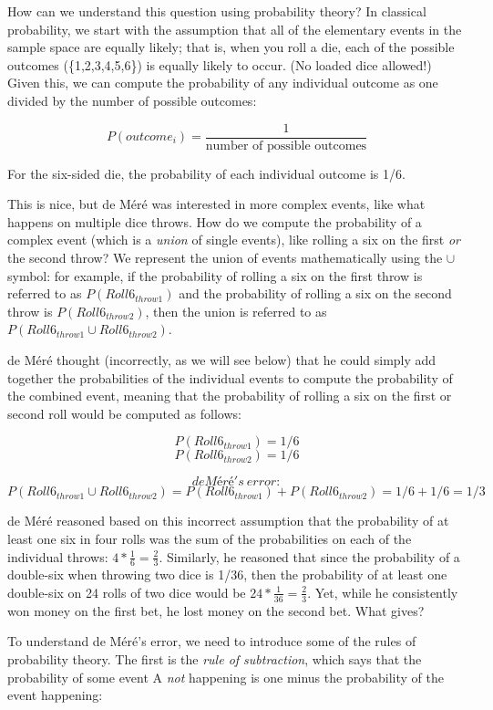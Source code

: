 \documentclass[
  12pt,
]{book}
\begin{document}
How can we understand this question using probability theory? In classical probability, we start with the assumption that all of the elementary events in the sample space are equally likely; that is, when you roll a die, each of the possible outcomes (\{1,2,3,4,5,6\}) is equally likely to occur. (No loaded dice allowed!) Given this, we can compute the probability of any individual outcome as one divided by the number of possible outcomes:

\[
P(outcome_i) = \frac{1}{\text{number of possible outcomes}}
\]

For the six-sided die, the probability of each individual outcome is 1/6.

This is nice, but de Méré was interested in more complex events, like what happens on multiple dice throws. How do we compute the probability of a complex event (which is a \emph{union} of single events), like rolling a six on the first \emph{or} the second throw? We represent the union of events mathematically using the \(\cup\) symbol: for example, if the probability of rolling a six on the first throw is referred to as \(P(Roll6_{throw1})\) and the probability of rolling a six on the second throw is \(P(Roll6_{throw2})\), then the union is referred to as \(P(Roll6_{throw1} \cup Roll6_{throw2})\).

de Méré thought (incorrectly, as we will see below) that he could simply add together the probabilities of the individual events to compute the probability of the combined event, meaning that the probability of rolling a six on the first or second roll would be computed as follows:

\[
P(Roll6_{throw1}) = 1/6
\]
\[
P(Roll6_{throw2}) = 1/6
\]

\[
de Méré's \ error:
\]
\[
P(Roll6_{throw1} \cup Roll6_{throw2}) = P(Roll6_{throw1}) + P(Roll6_{throw2}) = 1/6 + 1/6 = 1/3
\]

de Méré reasoned based on this incorrect assumption that the probability of at least one six in four rolls was the sum of the probabilities on each of the individual throws: \(4*\frac{1}{6}=\frac{2}{3}\). Similarly, he reasoned that since the probability of a double-six when throwing two dice is 1/36, then the probability of at least one double-six on 24 rolls of two dice would be \(24*\frac{1}{36}=\frac{2}{3}\). Yet, while he consistently won money on the first bet, he lost money on the second bet. What gives?

To understand de Méré's error, we need to introduce some of the rules of probability theory. The first is the \emph{rule of subtraction}, which says that the probability of some event A \emph{not} happening is one minus the probability of the event happening:
\end{document}

